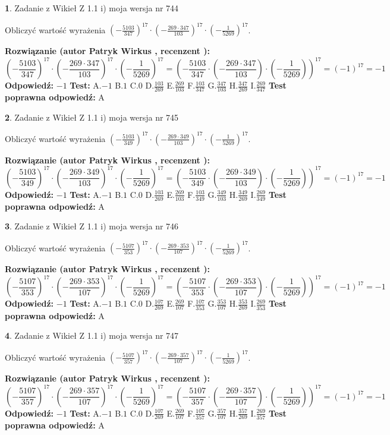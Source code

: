 \documentclass[12pt, a4paper]{article}
\theoremstyle{definition} %
\newtheorem{zad}{}
\newcommand{\zadStart}[1]{\begin{zad}#1\newline}
\newcommand{\zadStop}{\end{zad}}
\newcommand{\rozwStart}[2]{\noindent \textbf{Rozwiązanie (autor #1 , recenzent #2): }\newline}
\newcommand{\rozwStop}{\newline}
\newcommand{\odpStart}{\noindent \textbf{Odpowiedź:}\newline}
\newcommand{\odpStop}{\newline}
\newcommand{\testStart}{\noindent \textbf{Test:}\newline}
\newcommand{\testStop}{\newline}
\newcommand{\kluczStart}{\noindent \textbf{Test poprawna odpowiedź:}\newline}
\newcommand{\kluczStop}{\newline}
\begin{document}
\zadStart{Zadanie z Wikieł Z 1.1 i) moja wersja nr 744}

Obliczyć wartość wyrażenia $(-\frac{5103}{347})^{17} \cdot (-\frac{269 \cdot 347}{103})^{17} \cdot (-\frac{1}{5269})^{17}$.
\zadStop
\rozwStart{Patryk Wirkus}{}
$$(-\frac{5103}{347})^{17} \cdot (-\frac{269 \cdot 347}{103})^{17} \cdot (-\frac{1}{5269})^{17} = (-\frac{5103}{347} \cdot (-\frac{269 \cdot 347}{103}) \cdot (-\frac{1}{5269}))^{17} = (-1)^{17} = -1$$
\rozwStop
\odpStart
$-1$
\odpStop
\testStart
A.$-1$ B.$1$ C.$0$ D.$\frac{103}{269}$ E.$\frac{269}{103}$
F.$\frac{103}{347}$ G.$\frac{347}{103}$
H.$\frac{347}{269}$
I.$\frac{269}{347}$
\testStop
\kluczStart
A
\kluczStop



\zadStart{Zadanie z Wikieł Z 1.1 i) moja wersja nr 745}

Obliczyć wartość wyrażenia $(-\frac{5103}{349})^{17} \cdot (-\frac{269 \cdot 349}{103})^{17} \cdot (-\frac{1}{5269})^{17}$.
\zadStop
\rozwStart{Patryk Wirkus}{}
$$(-\frac{5103}{349})^{17} \cdot (-\frac{269 \cdot 349}{103})^{17} \cdot (-\frac{1}{5269})^{17} = (-\frac{5103}{349} \cdot (-\frac{269 \cdot 349}{103}) \cdot (-\frac{1}{5269}))^{17} = (-1)^{17} = -1$$
\rozwStop
\odpStart
$-1$
\odpStop
\testStart
A.$-1$ B.$1$ C.$0$ D.$\frac{103}{269}$ E.$\frac{269}{103}$
F.$\frac{103}{349}$ G.$\frac{349}{103}$
H.$\frac{349}{269}$
I.$\frac{269}{349}$
\testStop
\kluczStart
A
\kluczStop



\zadStart{Zadanie z Wikieł Z 1.1 i) moja wersja nr 746}

Obliczyć wartość wyrażenia $(-\frac{5107}{353})^{17} \cdot (-\frac{269 \cdot 353}{107})^{17} \cdot (-\frac{1}{5269})^{17}$.
\zadStop
\rozwStart{Patryk Wirkus}{}
$$(-\frac{5107}{353})^{17} \cdot (-\frac{269 \cdot 353}{107})^{17} \cdot (-\frac{1}{5269})^{17} = (-\frac{5107}{353} \cdot (-\frac{269 \cdot 353}{107}) \cdot (-\frac{1}{5269}))^{17} = (-1)^{17} = -1$$
\rozwStop
\odpStart
$-1$
\odpStop
\testStart
A.$-1$ B.$1$ C.$0$ D.$\frac{107}{269}$ E.$\frac{269}{107}$
F.$\frac{107}{353}$ G.$\frac{353}{107}$
H.$\frac{353}{269}$
I.$\frac{269}{353}$
\testStop
\kluczStart
A
\kluczStop



\zadStart{Zadanie z Wikieł Z 1.1 i) moja wersja nr 747}

Obliczyć wartość wyrażenia $(-\frac{5107}{357})^{17} \cdot (-\frac{269 \cdot 357}{107})^{17} \cdot (-\frac{1}{5269})^{17}$.
\zadStop
\rozwStart{Patryk Wirkus}{}
$$(-\frac{5107}{357})^{17} \cdot (-\frac{269 \cdot 357}{107})^{17} \cdot (-\frac{1}{5269})^{17} = (-\frac{5107}{357} \cdot (-\frac{269 \cdot 357}{107}) \cdot (-\frac{1}{5269}))^{17} = (-1)^{17} = -1$$
\rozwStop
\odpStart
$-1$
\odpStop
\testStart
A.$-1$ B.$1$ C.$0$ D.$\frac{107}{269}$ E.$\frac{269}{107}$
F.$\frac{107}{357}$ G.$\frac{357}{107}$
H.$\frac{357}{269}$
I.$\frac{269}{357}$
\testStop
\kluczStart
A
\kluczStop
\end{document}
